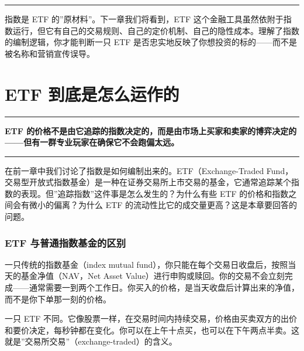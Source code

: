 \documentclass[a4paper,11pt,oneside,fontset=none,UTF8,zihao=-4]{ctexbook}
\begin{document}
\begin{center}{\color{dh-bronze}\rule{0.2\textwidth}{0.5pt}}\end{center}

指数是 ETF 的''原材料''。下一章我们将看到，ETF
这个金融工具虽然依附于指数运行，但它有自己的交易规则、自己的定价机制、自己的隐性成本。理解了指数的编制逻辑，你才能判断一只
ETF 是否忠实地反映了你想投资的标的------而不是被名称和营销宣传误导。

\newpage

\chapter{ETF
到底是怎么运作的}\label{etf-ux5230ux5e95ux662fux600eux4e48ux8fd0ux4f5cux7684}

\begin{center}{\color{dh-bronze}\rule{0.2\textwidth}{0.5pt}}\end{center}

\begin{dhquote}
\textbf{ETF
的价格不是由它追踪的指数决定的，而是由市场上买家和卖家的博弈决定的------但有一群专业玩家在确保它不会跑偏太远。}
\end{dhquote}

\begin{center}{\color{dh-bronze}\rule{0.2\textwidth}{0.5pt}}\end{center}

在前一章中我们讨论了指数是如何编制出来的。ETF（Exchange-Traded
Fund，交易型开放式指数基金）是一种在证券交易所上市交易的基金，它通常追踪某个指数的表现。但''追踪指数''这件事是怎么发生的？为什么有些
ETF 的价格和指数之间会有微小的偏离？为什么 ETF
的流动性比它的成交量更高？这是本章要回答的问题。

\subsection{ETF
与普通指数基金的区别}\label{etf-ux4e0eux666eux901aux6307ux6570ux57faux91d1ux7684ux533aux522b}

一只传统的指数基金（index mutual
fund），你只能在每个交易日收盘后，按照当天的基金净值（NAV，Net Asset
Value）进行申购或赎回。你的交易不会立刻完成------通常需要一到两个工作日。你买入的价格，是当天收盘后计算出来的净值，而不是你下单那一刻的价格。

一只 ETF
不同。它像股票一样，在交易时间内持续交易，价格由买卖双方的出价和要价决定，每秒钟都在变化。你可以在上午十点买，也可以在下午两点半卖。这就是''交易所交易''（exchange-traded）的含义。
\end{document}
